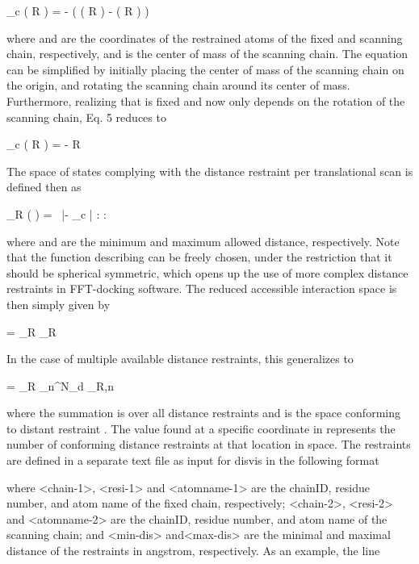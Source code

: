 \startformula
\rvec_c \left( R \right) = \rvecF - \left( \rvecS \left( R \right) - \rveccomS \left( R \right) \right)
\stopformula

where \m{\rvecF} and \m{\rvecS} are the coordinates of the restrained atoms of the fixed and
scanning chain, respectively, and \m{\rveccomS} is the center of mass of the scanning
chain. The equation can be simplified by initially placing the center of mass
of the scanning chain on the origin, and rotating the scanning chain around its
center of mass. Furthermore, realizing that \m{\rvecF} is fixed and \m{\rvecS} now only depends
on the rotation of the scanning chain, Eq. 5 reduces to

\startformula
\rvec_c \left( R \right) = \rvecF - R \rvecS
\stopformula

The space of states complying with the distance restraint per translational
scan  is defined then as

\startformula
\boldL_R \left( \rvec \right) = \startmathcases
\NC {}\ \dmin \leq |\rvec - \rvec_c | \leq \dmax:  \NR
\NC \NC \NR
\NC {}: \NR
\stopmathcases
\stopformula

where \m{\dmin} and \m{\dmax} are the minimum and maximum allowed distance, respectively.
Note that the function describing  can be freely chosen, under the
restriction that it should be spherical symmetric, which opens up the use of
more complex distance restraints in FFT-docking software. The reduced
accessible interaction space \m{\redais} is then simply given by

\startformula
\redais = \boldA_R \times \boldL_R
\stopformula

In the case of multiple available distance restraints, this generalizes to

\startformula
\redais = \boldA_R \times \sum_n^{N_d} \boldL_{R,n}
\stopformula

where the summation is over all distance restraints  and  is the space
conforming to distant restraint . The value found at a specific coordinate in
\m{\redais} represents the number of conforming distance restraints at that
location in space. The restraints are defined in a separate text file as input
for disvis in the following format


where <chain-1>, <resi-1> and <atomname-1> are the chainID, residue number, and
atom name of the fixed chain, respectively; <chain-2>, <resi-2> and
<atomname-2> are the chainID, residue number, and atom name of the scanning
chain; and <min-dis> and<max-dis> are the minimal and maximal distance of the
restraints in angstrom, respectively. As an example, the line

